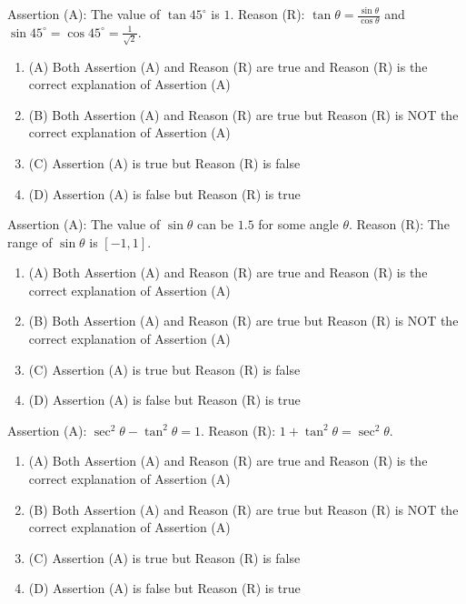 \documentclass[12pt,a4paper]{exam}
\begin{document}
\begin{questions}
\question[1] Assertion (A): The value of $\tan 45^\circ$ is $1$. Reason (R): $\tan \theta = \frac{\sin \theta}{\cos \theta}$ and $\sin 45^\circ = \cos 45^\circ = \frac{1}{\sqrt{2}}$.
\begin{enumerate}[label=(\Alph*)]
  \item (A) Both Assertion (A) and Reason (R) are true and Reason (R) is the correct explanation of Assertion (A)
  \item (B) Both Assertion (A) and Reason (R) are true but Reason (R) is NOT the correct explanation of Assertion (A)
  \item (C) Assertion (A) is true but Reason (R) is false
  \item (D) Assertion (A) is false but Reason (R) is true
\end{enumerate}
\vspace{0.15cm}

\question[1] Assertion (A): The value of $\sin \theta$ can be $1.5$ for some angle $\theta$. Reason (R): The range of $\sin \theta$ is $[-1, 1]$.
\begin{enumerate}[label=(\Alph*)]
  \item (A) Both Assertion (A) and Reason (R) are true and Reason (R) is the correct explanation of Assertion (A)
  \item (B) Both Assertion (A) and Reason (R) are true but Reason (R) is NOT the correct explanation of Assertion (A)
  \item (C) Assertion (A) is true but Reason (R) is false
  \item (D) Assertion (A) is false but Reason (R) is true
\end{enumerate}
\vspace{0.15cm}

\question[1] Assertion (A): $\sec^2 \theta - \tan^2 \theta = 1$. Reason (R): $1 + \tan^2 \theta = \sec^2 \theta$.
\begin{enumerate}[label=(\Alph*)]
  \item (A) Both Assertion (A) and Reason (R) are true and Reason (R) is the correct explanation of Assertion (A)
  \item (B) Both Assertion (A) and Reason (R) are true but Reason (R) is NOT the correct explanation of Assertion (A)
  \item (C) Assertion (A) is true but Reason (R) is false
  \item (D) Assertion (A) is false but Reason (R) is true
\end{enumerate}
\vspace{0.15cm}


\end{questions}
\end{document}
